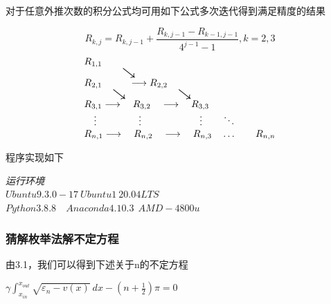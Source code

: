 \documentclass[11pt, a4paper, oneside]{ctexart}
\begin{document}
{{{{{    
        对于任意外推次数的积分公式均可用如下公式多次迭代得到满足精度的结果
    
    \begin{center}\vspace{-13mm}
        $$
R_{k, j}=R_{k, j-1}+\frac{R_{k, j-1}-R_{k-1, j-1}}{4^{j-1}-1}, k=2,3
$$
        $$
        \begin{array}{l}\vspace{0mm}
        {R_{1,1}}_{_{_{_{\qquad\scaleto{\searrow }{10pt}}}}}  \\
        {R_{2,1}}_{_{_{_{\quad\scaleto{\searrow }{10pt}}}}} \stackrel{ }{\longrightarrow} {R_{2,2}}_{_{_{_{\quad\scaleto{\searrow }{10pt}}}}} \\
        R_{3,1} \longrightarrow \quad R_{3,2}\quad \longrightarrow \quad R_{3,3} \\
        \quad\vdots \qquad\qquad\  \vdots \qquad\qquad\qquad \vdots \qquad \ddots \\
        R_{n, 1} \longrightarrow \quad R_{n, 2} \quad\longrightarrow \quad R_{n, 3} \quad \ldots \qquad R_{n, n}
        \end{array}
        $$
    \end{center}

    }
    
}

\vspace{30mm}

{
    程序实现如下
    
    
    \begin{flushright}
    \scriptsize\emph{运行环境\\$Ubuntu 9.3.0-17\ Ubuntu1~20.04LTS$}\\
    \scriptsize\emph{$Python 3.8.8$\ \ $Anaconda 4.10.3\ \  AMD-4800u$}
        
    \end{flushright}


}
    
\subsubsection{猜解枚举法解不定方程}

{
    由3.1，我们可以得到下述关于n的不定方程
    \begin{center}
        $\gamma \int ^{x_{out}} _{x_{in}}\sqrt{\varepsilon_n-v(x)}\ dx-
        (n+\frac 1 2 )\pi=0$
    \end{center}


}}}}
\end{document}
